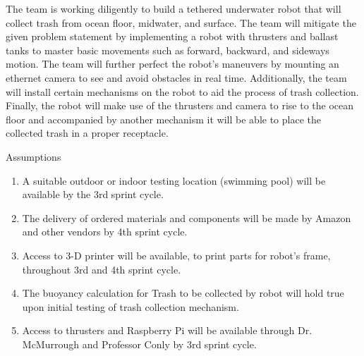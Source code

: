 The team is working diligently to build a tethered underwater robot that will collect trash from ocean floor, midwater, and surface. The team will mitigate the given problem statement by implementing a robot with thrusters and ballast tanks to master basic movements such as forward, backward, and sideways motion. The team will further perfect the robot's maneuvers by mounting an ethernet camera to see and avoid obstacles in real time. Additionally, the team will install certain mechanisms on the robot to aid the process of trash collection. Finally, the robot will make use of the thrusters and camera to rise to the ocean floor and accompanied by another mechanism it will be able to place the collected trash in a proper receptacle.  

 

Assumptions  

 
\begin {enumerate}
	\item A suitable outdoor or indoor testing location (swimming pool) will be available by the 3rd sprint cycle. 

	\item The delivery of ordered materials and components will be made by Amazon and other vendors by 4th sprint cycle. 

	\item Access to 3-D printer will be available, to print parts for robot's frame, throughout 3rd and 4th sprint cycle.  

	\item The buoyancy calculation for Trash to be collected by robot will hold true upon initial testing of trash collection mechanism.  

	\item Access to thrusters and Raspberry Pi will be available through Dr. McMurrough and Professor Conly by 3rd sprint cycle. 
\end{enumerate}